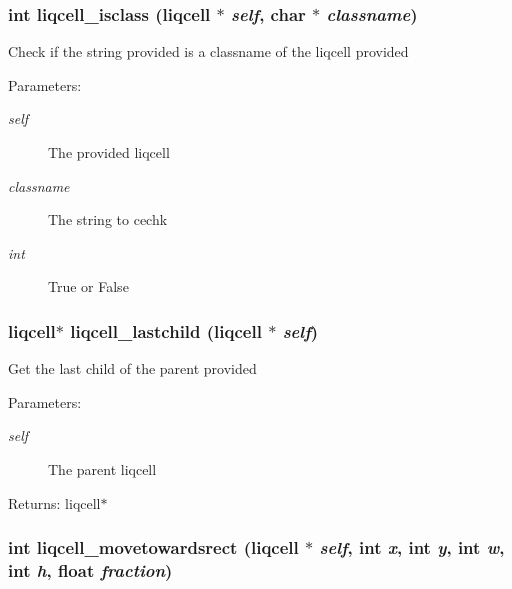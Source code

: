 \subsubsection[{liqcell\_\-isclass}]{\setlength{\rightskip}{0pt plus 5cm}int liqcell\_\-isclass (liqcell $\ast$ {\em self}, \/  char $\ast$ {\em classname})}\label{d5/da2/liqcell_8c_0a0c5640d3f6c8afc9c65fd9ecc9765d}


Check if the string provided is a classname of the liqcell provided \begin{Desc}
\item[Parameters:]
\begin{description}
\item[{\em self}]The provided liqcell \item[{\em classname}]The string to cechk \item[{\em int}]True or False \end{description}
\end{Desc}
\subsubsection[{liqcell\_\-lastchild}]{\setlength{\rightskip}{0pt plus 5cm}liqcell$\ast$ liqcell\_\-lastchild (liqcell $\ast$ {\em self})}\label{d5/da2/liqcell_8c_18e2aefa01c9d9eee6d241689e9454c3}


Get the last child of the parent provided \begin{Desc}
\item[Parameters:]
\begin{description}
\item[{\em self}]The parent liqcell \end{description}
\end{Desc}
\begin{Desc}
\item[Returns:]liqcell$\ast$ \end{Desc}
\subsubsection[{liqcell\_\-movetowardsrect}]{\setlength{\rightskip}{0pt plus 5cm}int liqcell\_\-movetowardsrect (liqcell $\ast$ {\em self}, \/  int {\em x}, \/  int {\em y}, \/  int {\em w}, \/  int {\em h}, \/  float {\em fraction})}\label{d5/da2/liqcell_8c_8d005bfc84ca09d136e2ef94c47fdf8b}


